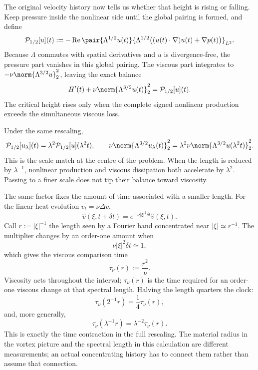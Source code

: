 
The original velocity history now tells us whether that height is rising or falling.
Keep pressure inside the nonlinear side until the global pairing is formed, and define
\[
  \mathcal P_{1/2}[u](t)
  :=
  -\operatorname{Re}
  \pair
    {\Lambda^{1/2}u(t)}
    {\Lambda^{1/2}\bigl((u(t)\cdot\nabla)u(t)+\nabla p(t)\bigr)}_{L^2}.
\]
Because \(\Lambda\) commutes with spatial derivatives and \(u\) is divergence-free, the pressure part vanishes in this global pairing.
The viscous part integrates to \(-\nu\norm{\Lambda^{3/2}u}_2^2\), leaving the exact balance
\[
  H'(t)
  +
  \nu\norm{\Lambda^{3/2}u(t)}_2^2
  =
  \mathcal P_{1/2}[u](t).
\]
The critical height rises only when the complete signed nonlinear production exceeds the simultaneous viscous loss.

Under the same rescaling,
\[
  \mathcal P_{1/2}[u_\lambda](t)
  =
  \lambda^2\mathcal P_{1/2}[u](\lambda^2t),
  \qquad
  \nu\norm{\Lambda^{3/2}u_\lambda(t)}_2^2
  =
  \lambda^2\nu\norm{\Lambda^{3/2}u(\lambda^2t)}_2^2.
\]
This is the scale match at the centre of the problem.
When the length is reduced by \(\lambda^{-1}\), nonlinear production and viscous dissipation both accelerate by \(\lambda^2\).
Passing to a finer scale does not tip their balance toward viscosity.


The same factor fixes the amount of time associated with a smaller length.
For the linear heat evolution \(v_t=\nu\Delta v\),
\[
  \widehat v(\xi,t+\delta t)
  =
  e^{-\nu|\xi|^2\delta t}\widehat v(\xi,t).
\]
Call \(r:=|\xi|^{-1}\) the length seen by a Fourier band concentrated near \(|\xi|\simeq r^{-1}\).
The multiplier changes by an order-one amount when
\[
  \nu|\xi|^2\delta t\simeq1,
\]
which gives the viscous comparison time
\[
  \tau_\nu(r)
  :=
  \frac{r^2}{\nu}.
\]
Viscosity acts throughout the interval; \(\tau_\nu(r)\) is the time required for an order-one viscous change at that spectral length.
Halving the length quarters the clock:
\[
  \tau_\nu(2^{-1}r)
  =
  \frac14\tau_\nu(r),
\]
and, more generally,
\[
  \tau_\nu(\lambda^{-1}r)
  =
  \lambda^{-2}\tau_\nu(r).
\]
This is exactly the time contraction in the full \NavierStokes{} rescaling.
The material radius in the vortex picture and the spectral length in this calculation are different measurements; an actual concentrating history has to connect them rather than assume that connection.

